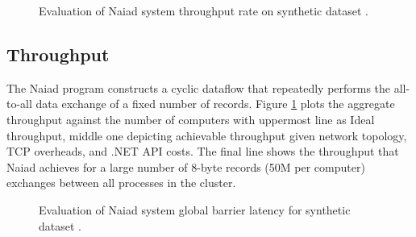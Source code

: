 \documentclass[9pt,twocolumn,twoside]{../../styles/osajnl}
\begin{document}
\begin{figure}[htbp]
\centering
{}
\caption{ Evaluation of Naiad system throughput rate on synthetic
  dataset \cite{paper1-Naiad}.}
\label{throughput}
\end{figure}

\subsection{Throughput}
The Naiad program constructs a cyclic dataflow that repeatedly
performs the all-to-all data exchange of a fixed number of records.
Figure \ref{throughput} plots the aggregate throughput against the
number of computers with uppermost line as Ideal throughput, middle
one depicting achievable throughput given network topology, TCP
overheads, and .NET API costs. The final line shows the throughput
that Naiad achieves for a large number of 8-byte records (50M per
computer) exchanges between all processes in the cluster.

\begin{figure}[htbp]
\centering
{}
\caption{ Evaluation of Naiad system global barrier latency for
  synthetic dataset \cite{paper1-Naiad}.}
\label{latency}
\end{figure}
\end{document}
